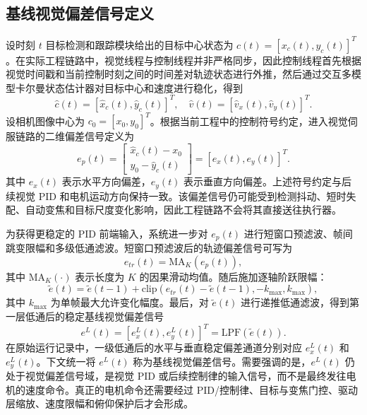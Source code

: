 \documentclass[journal]{IEEEtran}
\newcommand{\legacy}{e^{L}}
\begin{document}
\subsection{基线视觉偏差信号定义}
设时刻 $t$ 目标检测和跟踪模块给出的目标中心状态为 $c(t)=[x_c(t),y_c(t)]^T$。在实际工程链路中，视觉线程与控制线程并非严格同步，因此控制线程首先根据视觉时间戳和当前控制时刻之间的时间差对轨迹状态进行外推，然后通过交互多模型卡尔曼状态估计器对目标中心和速度进行稳化，得到
\begin{equation}
\hat{c}(t)=[\hat{x}_c(t),\hat{y}_c(t)]^T,\quad
\hat{v}(t)=[\hat{v}_x(t),\hat{v}_y(t)]^T .
\end{equation}
设相机图像中心为 $c_0=[x_0,y_0]^T$。根据当前工程中的控制符号约定，进入视觉伺服链路的二维偏差信号定义为
\begin{equation}
e_p(t)=
\begin{bmatrix}
\hat{x}_c(t)-x_0\\
y_0-\hat{y}_c(t)
\end{bmatrix}
=[e_x(t),e_y(t)]^T .
\end{equation}
其中 $e_x(t)$ 表示水平方向偏差，$e_y(t)$ 表示垂直方向偏差。上述符号约定与后续视觉 PID 和电机运动方向保持一致。该偏差信号仍可能受到检测抖动、短时失配、自动变焦和目标尺度变化影响，因此工程链路不会将其直接送往执行器。

为获得更稳定的 PID 前端输入，系统进一步对 $e_p(t)$ 进行短窗口预滤波、帧间跳变限幅和多级低通滤波。短窗口预滤波后的轨迹偏差信号可写为
\begin{equation}
e_{tr}(t)=\mathrm{MA}_{K}\left(e_p(t)\right),
\end{equation}
其中 $\mathrm{MA}_{K}(\cdot)$ 表示长度为 $K$ 的因果滑动均值。随后施加逐轴阶跃限幅：
\begin{equation}
\tilde{e}(t)=\tilde{e}(t-1)+\mathrm{clip}\!\left(e_{tr}(t)-\tilde{e}(t-1),-k_{\max},k_{\max}\right),
\end{equation}
其中 $k_{\max}$ 为单帧最大允许变化幅度。最后，对 $\tilde{e}(t)$ 进行递推低通滤波，得到第一层低通后的稳定基线视觉偏差信号
\begin{equation}
\legacy(t)=[e_x^L(t),e_y^L(t)]^T=\mathrm{LPF}(\tilde{e}(t)).
\end{equation}
在原始运行记录中，一级低通后的水平与垂直稳定偏差通道分别对应 $e_x^L(t)$ 和 $e_y^L(t)$。下文统一将 $\legacy(t)$ 称为基线视觉偏差信号。需要强调的是，$\legacy(t)$ 仍处于视觉偏差信号域，是视觉 PID 或后续控制律的输入信号，而不是最终发往电机的速度命令。真正的电机命令还需要经过 PID/控制律、目标与变焦门控、驱动层缩放、速度限幅和俯仰保护后才会形成。
\end{document}
